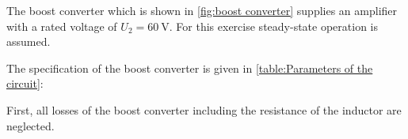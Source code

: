 

The boost converter which is shown in \autoref{fig:boost converter} supplies an amplifier with a rated voltage of $U_{\mathrm{2}} = \SI{60}{\volt}$. For this exercise steady-state operation is assumed.



The specification of the boost converter is given in \autoref{table:Parameters of the circuit}:



First, all losses of the boost converter including the resistance of the inductor are neglected.


